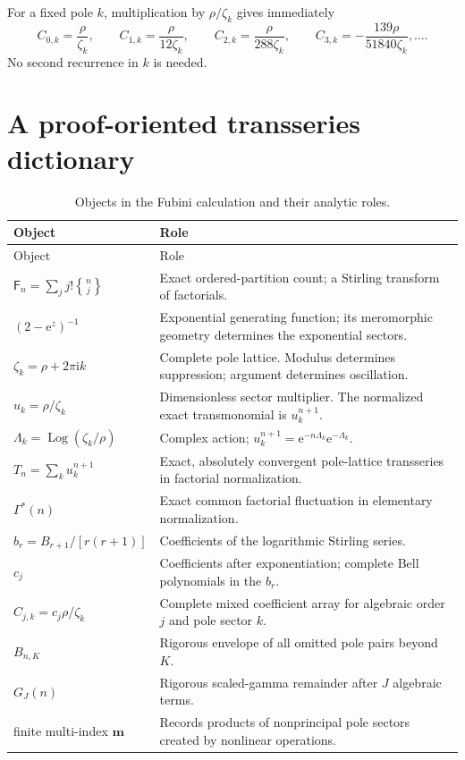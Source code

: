 \documentclass[11pt,a4paper,oneside]{article}
\theoremstyle{definition}
\theoremstyle{remark}
\newcommand{\Fub}{\mathsf{F}}
\newcommand{\StirlingII}[2]{\genfrac\{\}{0pt}{}{#1}{#2}}
\newcommand{\Log}{\operatorname{Log}}
\newcommand{\e}{\mathrm{e}}
\newcommand{\ii}{\mathrm{i}}
\newcommand{\GammaStar}{\Gamma^{\!*}}
\begin{document}
For a fixed pole $k$, multiplication by $\rho/\zeta_k$ gives immediately
\[
 C_{0,k}=\frac{\rho}{\zeta_k},\qquad
 C_{1,k}=\frac{\rho}{12\zeta_k},\qquad
 C_{2,k}=\frac{\rho}{288\zeta_k},\qquad
 C_{3,k}=-\frac{139\rho}{51840\zeta_k},\ldots.
\]
No second recurrence in $k$ is needed.

\section{A proof-oriented transseries dictionary}\label{app:dictionary}
\begin{longtable}{@{}p{}p{}@{}}
\caption{Objects in the Fubini calculation and their analytic roles.}
\label{tab:dictionary}\\
\toprule
Object & Role\\
\midrule
\endfirsthead
\toprule
Object & Role\\
\midrule
\endhead
$\Fub_n=\sum_jj!\StirlingII{n}{j}$
& Exact ordered-partition count; a Stirling transform of factorials.\\[1mm]
$(2-\e^z)^{-1}$
& Exponential generating function; its meromorphic geometry determines the
  exponential sectors.\\[1mm]
$\zeta_k=\rho+2\pi\ii k$
& Complete pole lattice.  Modulus determines suppression; argument determines
  oscillation.\\[1mm]
$u_k=\rho/\zeta_k$
& Dimensionless sector multiplier.  The normalized exact transmonomial is
  $u_k^{n+1}$.\\[1mm]
$\Lambda_k=\Log(\zeta_k/\rho)$
& Complex action; $u_k^{n+1}=\e^{-n\Lambda_k}\e^{-\Lambda_k}$.\\[1mm]
$T_n=\sum_ku_k^{n+1}$
& Exact, absolutely convergent pole-lattice transseries in factorial
  normalization.\\[1mm]
$\GammaStar(n)$
& Exact common factorial fluctuation in elementary normalization.\\[1mm]
$b_r=B_{r+1}/[r(r+1)]$
& Coefficients of the logarithmic Stirling series.\\[1mm]
$c_j$
& Coefficients after exponentiation; complete Bell polynomials in the $b_r$.\\[1mm]
$C_{j,k}=c_j\rho/\zeta_k$
& Complete mixed coefficient array for algebraic order $j$ and pole sector
  $k$.\\[1mm]
$B_{n,K}$
& Rigorous envelope of all omitted pole pairs beyond $K$.\\[1mm]
$G_J(n)$
& Rigorous scaled-gamma remainder after $J$ algebraic terms.\\[1mm]
finite multi-index $\bm m$
& Records products of nonprincipal pole sectors created by nonlinear
  operations.\\
\bottomrule
\end{longtable}
\end{document}
